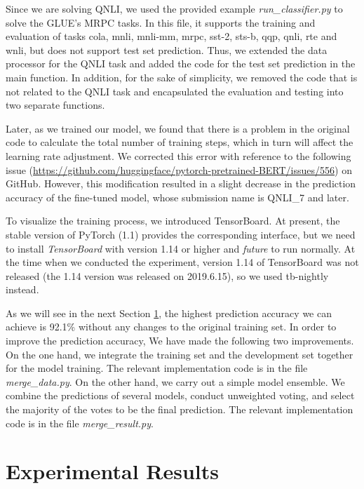 \documentclass[10pt,journal,compsoc]{IEEEtran}
\begin{document}
Since we are solving QNLI, we used the provided example \emph{run\_classifier.py} to solve the GLUE's MRPC tasks. In this file, it supports the training and evaluation of tasks cola, mnli, mnli-mm, mrpc, sst-2, sts-b, qqp, qnli, rte and wnli, but does not support test set prediction. Thus, we extended the data processor for the QNLI task and added the code for the test set prediction in the main function. In addition, for the sake of simplicity, we removed the code that is not related to the QNLI task and encapsulated the evaluation and testing into two separate functions. 


Later, as we trained our model, we found that there is a problem in the original code to calculate the total number of training steps, which in turn will affect the learning rate adjustment. We corrected this error with reference to the following issue (\url{https://github.com/huggingface/pytorch-pretrained-BERT/issues/556}) on GitHub. However, this modification resulted in a slight decrease in the prediction accuracy of the fine-tuned model, whose submission name is QNLI\_7 and later.

To visualize the training process, we introduced TensorBoard. At present, the stable version of PyTorch (1.1) provides the corresponding interface, but we need to install \emph{TensorBoard} with version 1.14 or higher and \emph{future} to run normally. At the time when we conducted the experiment, version 1.14 of TensorBoard was not released (the 1.14 version was released on 2019.6.15), so we used tb-nightly instead.

As we will see in the next Section \ref{sec:experimental_results}, the highest prediction accuracy we can achieve is 92.1\% without any changes to the original training set. In order to improve the prediction accuracy, We have made the following two improvements. On the one hand, we integrate the training set and the development set together for the model training. The relevant implementation code is in the file \emph{merge\_data.py}. On the other hand, we carry out a simple model ensemble. We combine the predictions of several models, conduct unweighted voting, and select the majority of the votes to be the final prediction. The relevant implementation code is in the file \emph{merge\_result.py}.

\section{Experimental Results}
\label{sec:experimental_results}
\end{document}
